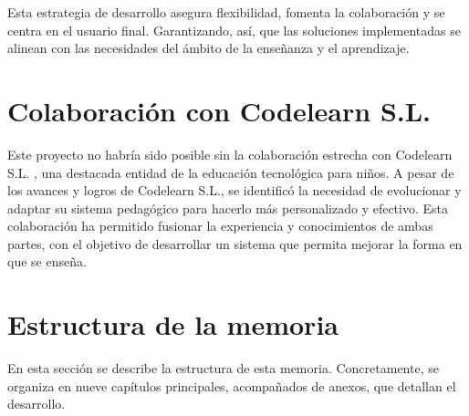 Esta estrategia de desarrollo asegura flexibilidad, fomenta la colaboración y se centra en el usuario final. Garantizando, así, que las soluciones implementadas se alinean con las necesidades del ámbito de la enseñanza y el aprendizaje.

\section{Colaboración con Codelearn S.L.}

Este proyecto no habría sido posible sin la colaboración estrecha con Codelearn S.L. \cite{codelearn}, una destacada entidad de la educación tecnológica para niños. A pesar de los avances y logros de Codelearn S.L., se identificó la necesidad de evolucionar y adaptar su sistema pedagógico para hacerlo más personalizado y efectivo. Esta colaboración ha permitido fusionar la experiencia y conocimientos de ambas partes, con el objetivo de desarrollar un sistema que permita mejorar la forma en que se enseña.

\section{Estructura de la memoria}

En esta sección se describe la estructura de esta memoria. Concretamente, se organiza en nueve capítulos principales, acompañados de anexos, que detallan el desarrollo. 

